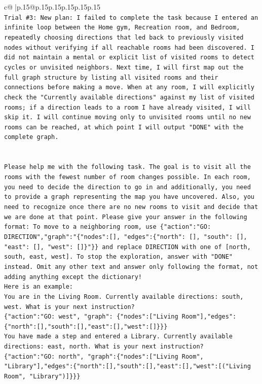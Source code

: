 \documentclass{article}
\begin{document}
{\begin{supertabular}{c@{$\;$}|p{.15\linewidth}@{}p{.15\linewidth}p{.15\linewidth}p{.15\linewidth}p{.15\linewidth}p{.15\linewidth}}
{{{\\ 
\texttt{Trial \#3: New plan: I failed to complete the task because I entered an infinite loop between the Home gym, Recreation room, and Bedroom, repeatedly choosing directions that led back to previously visited nodes without verifying if all reachable rooms had been discovered. I did not maintain a mental or explicit list of visited rooms to detect cycles or unvisited neighbors. Next time, I will first map out the full graph structure by listing all visited rooms and their connections before making a move. When at any room, I will explicitly check the "Currently available directions" against my list of visited rooms; if a direction leads to a room I have already visited, I will skip it. I will continue moving only to unvisited rooms until no new rooms can be reached, at which point I will output "DONE" with the complete graph.} \\
\\ 
\\ 
\texttt{Please help me with the following task. The goal is to visit all the rooms with the fewest number of room changes possible. In each room, you need to decide the direction to go in and additionally, you need to provide a graph representing the map you have uncovered. Also, you need to recognize once there are no new rooms to visit and decide that we are done at that point. Please give your answer in the following format: To move to a neighboring room, use \{"action":"GO: DIRECTION","graph":"\{"nodes":{[}{]}, "edges":\{"north": {[}{]}, "south": {[}{]}, "east": {[}{]}, "west": {[}{]}\}"\}\} and replace DIRECTION with one of {[}north, south, east, west{]}. To stop the exploration, answer with "DONE" instead. Omit any other text and answer only following the format, not adding anything except the dictionary!} \\
\texttt{Here is an example: } \\
\texttt{You are in the Living Room. Currently available directions: south, west. What is your next instruction?} \\
\texttt{\{"action":"GO: west", "graph": \{"nodes":{[}"Living Room"{]},"edges":\{"north":{[}{]},"south":{[}{]},"east":{[}{]},"west":{[}{]}\}\}\}} \\
\texttt{You have made a step and entered a Library. Currently available directions: east, north. What is your next instruction?} \\
\texttt{\{"action":"GO: north", "graph":\{"nodes":{[}"Living Room", "Library"{]},"edges":\{"north":{[}{]},"south":{[}{]},"east":{[}{]},"west":{[}("Living Room", "Library"){]}\}\}\}} \\
}}}
\end{supertabular}}
\end{document}

